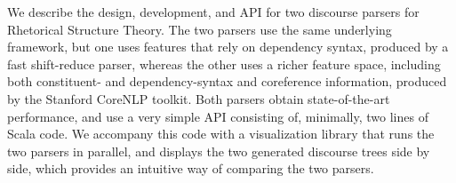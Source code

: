 We describe the design, development, and API for two discourse parsers for Rhetorical Structure Theory. The two parsers use the same underlying framework, but one uses features that rely on dependency syntax, produced by a fast shift-reduce parser, whereas the other uses a richer feature space, including both constituent- and dependency-syntax and coreference information, produced by the Stanford CoreNLP toolkit. Both parsers obtain state-of-the-art performance, and use a very simple API consisting of, minimally, two lines of Scala code. We accompany this code with a visualization library that runs the two parsers in parallel, and displays the two generated discourse trees side by side, which provides an intuitive way of comparing the two parsers.
